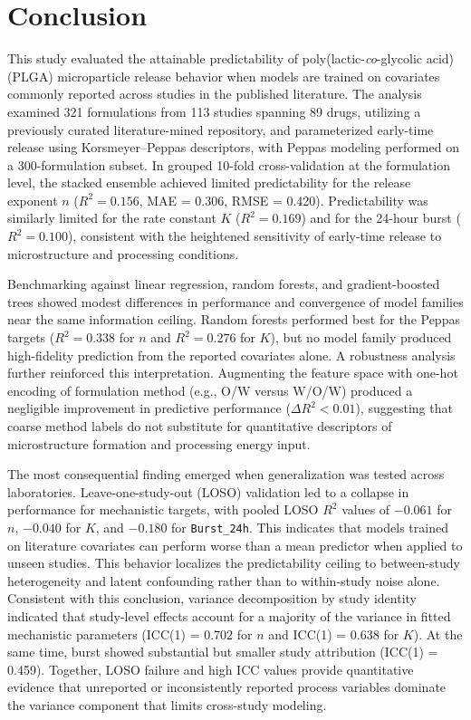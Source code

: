 \documentclass[preprint,12pt,authoryear]{elsarticle}
\begin{document}

\section{Conclusion}

This study evaluated the attainable predictability of poly(lactic-\emph{co}-glycolic acid) (PLGA) microparticle release behavior when models are trained on covariates commonly reported across studies in the published literature. The analysis examined 321 formulations from 113 studies spanning 89 drugs, utilizing a previously curated literature-mined repository, and parameterized early-time release using Korsmeyer--Peppas descriptors, with Peppas modeling performed on a 300-formulation subset. In grouped 10-fold cross-validation at the formulation level, the stacked ensemble achieved limited predictability for the release exponent $n$ ($R^2 = 0.156$, MAE = 0.306, RMSE = 0.420). Predictability was similarly limited for the rate constant $K$ ($R^2 = 0.169$) and for the 24-hour burst ($R^2 = 0.100$), consistent with the heightened sensitivity of early-time release to microstructure and processing conditions.

Benchmarking against linear regression, random forests, and gradient-boosted trees showed modest differences in performance and convergence of model families near the same information ceiling. Random forests performed best for the Peppas targets ($R^2 = 0.338$ for $n$ and $R^2 = 0.276$ for $K$), but no model family produced high-fidelity prediction from the reported covariates alone. A robustness analysis further reinforced this interpretation. Augmenting the feature space with one-hot encoding of formulation method (e.g., O/W versus W/O/W) produced a negligible improvement in predictive performance ($\Delta R^2 < 0.01$), suggesting that coarse method labels do not substitute for quantitative descriptors of microstructure formation and processing energy input.

The most consequential finding emerged when generalization was tested across laboratories. Leave-one-study-out (LOSO) validation led to a collapse in performance for mechanistic targets, with pooled LOSO $R^2$ values of $-0.061$ for $n$, $-0.040$ for $K$, and $-0.180$ for \texttt{Burst\_24h}. This indicates that models trained on literature covariates can perform worse than a mean predictor when applied to unseen studies. This behavior localizes the predictability ceiling to between-study heterogeneity and latent confounding rather than to within-study noise alone. Consistent with this conclusion, variance decomposition by study identity indicated that study-level effects account for a majority of the variance in fitted mechanistic parameters (ICC(1) = 0.702 for $n$ and ICC(1) = 0.638 for $K$). At the same time, burst showed substantial but smaller study attribution (ICC(1) = 0.459). Together, LOSO failure and high ICC values provide quantitative evidence that unreported or inconsistently reported process variables dominate the variance component that limits cross-study modeling.
\end{document}
